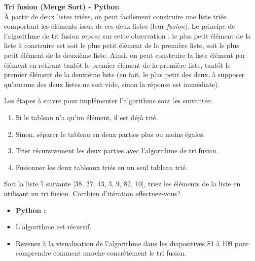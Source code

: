 \begin{Exercice} [30 minutes] \textbf{Tri fusion (Merge Sort) - Python} \\
    À partir de deux listes triées, on peut facilement construire une liste triée comportant les éléments issus de ces deux listes (leur \textit{fusion}). Le principe de l'algorithme de tri fusion repose sur cette observation : le plus petit élément de la liste à construire est soit le plus petit élément de la première liste, soit le plus petit élément de la deuxième liste. Ainsi, on peut construire la liste élément par élément en retirant tantôt le premier élément de la première liste, tantôt le premier élément de la deuxième liste (en fait, le plus petit des deux, à supposer qu'aucune des deux listes ne soit vide, sinon la réponse est immédiate). 
    
    Les étapes à suivre pour implémenter l'algorithme sont les suivantes:
    \begin{enumerate}
        \item Si le tableau n'a qu'un élément, il est déjà trié.
        \item Sinon, séparer le tableau en deux parties plus ou moins égales.
        \item Trier récursivement les deux parties avec l'algorithme de tri fusion.
        \item Fusionner les deux tableaux triés en un seul tableau trié.
    \end{enumerate}
    
    Soit la liste \lstinline{l} suivante [38, 27, 43, 3, 9, 82, 10], triez les éléments de la liste en utilisant un tri fusion. Combien d'itération effectuez-vous?
    
    \begin{itemize}
        \item \textbf{Python :}
            
    \end{itemize}
    
    \begin{conseil}
    \begin{itemize}
        \item L'algorithme est récursif. 
        \item Revenez à la visualisation de l'algorithme dans les diapositives 81 à 109 pour comprendre comment marche concrètement le tri fusion. 
    \end{itemize}
    
    \end{conseil}
    

\end{Exercice}
